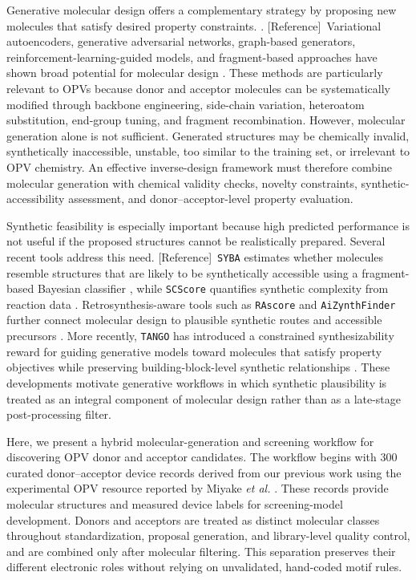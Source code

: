 \documentclass[12pt]{article}
\newcommand{\adref}{{\color{magenta}[Reference]}}
\begin{document}
Generative molecular design offers a complementary strategy by proposing new molecules that satisfy desired property constraints. \cite{sanchezlengeling2018inverse}. \adref\ Variational autoencoders, generative adversarial networks, graph-based generators, reinforcement-learning-guided models, and fragment-based approaches have shown broad potential for molecular design 
\cite{gomezbombarelli2018automatic,guimaraes2017objective,jin2018junction,elton2019deep}. These methods are particularly relevant to OPVs because donor and acceptor molecules can be systematically modified through backbone engineering, side-chain variation, heteroatom substitution, end-group tuning, and fragment recombination. However, molecular generation alone is not sufficient. Generated structures may be chemically invalid, synthetically inaccessible, unstable, too similar to the training set, or irrelevant to OPV chemistry. An effective inverse-design framework must therefore combine molecular generation with chemical validity checks, novelty constraints, synthetic-accessibility assessment, and donor--acceptor-level property evaluation.

Synthetic feasibility is especially important because high predicted performance is not useful if the proposed structures cannot be realistically prepared. Several recent tools address this need. \cite{gao2020synthesizability} \adref\ \texttt{SYBA} estimates whether molecules resemble structures that are likely to be synthetically accessible using a fragment-based Bayesian classifier \cite{vorsilak2020syba}, while \texttt{SCScore} quantifies synthetic complexity from reaction data \cite{coley2018scscore}. Retrosynthesis-aware tools such as \texttt{RAscore} and \texttt{AiZynthFinder} further connect molecular design to plausible synthetic routes and accessible precursors \cite{thakkar2021rascore,genheden2020aizynthfinder}. More recently, \texttt{TANGO} has introduced a constrained synthesizability reward for guiding generative models toward molecules that satisfy property objectives while preserving building-block-level synthetic relationships \cite{guo2026tango}. These developments motivate generative workflows in which synthetic plausibility is treated as an integral component of molecular design rather than as a late-stage post-processing filter.

Here, we present a hybrid molecular-generation and screening workflow for discovering OPV donor and acceptor candidates. The workflow begins with 300 curated donor--acceptor device records derived from our previous work using the experimental OPV resource reported by Miyake \textit{et al.} \cite{miyake2021machine}. These records provide molecular structures and measured device labels for screening-model development. Donors and acceptors are treated as distinct molecular classes throughout standardization, proposal generation, and library-level quality control, and are combined only after molecular filtering. This separation preserves their different electronic roles without relying on unvalidated, hand-coded motif rules.
\end{document}
